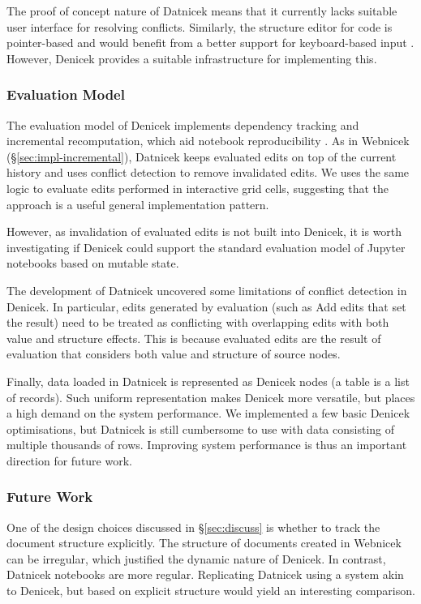 \documentclass[sigconf,anonymous,screen]{acmart}
\newcommand{\ident}[1]{{\sffamily #1}}
\begin{document}
The proof of concept nature of Datnicek means that it currently lacks suitable user interface for
resolving conflicts. Similarly, the structure editor for code is pointer-based and would benefit from
a better support for keyboard-based input \cite{moon-2022-tylr,beckman-2023-sandblocks}.
However, Denicek provides a suitable infrastructure for implementing this.

\subsubsection*{Evaluation Model}
The evaluation model of Denicek implements dependency tracking and incremental recomputation,
which aid notebook reproducibility \cite{petricek-2018-wrattler,koop-2017-dataflow}. As in
Webnicek (\S\ref{sec:impl-incremental}), Datnicek keeps evaluated edits on top of the current history
and uses conflict detection to remove invalidated edits. We uses the same logic to evaluate
edits performed in interactive grid cells, suggesting that the approach is a useful general
implementation pattern.

However, as invalidation of evaluated edits is not built into Deni\-cek, it is worth investigating
if Denicek could support the standard evaluation model of Jupyter notebooks based on mutable state.

The development of Datnicek uncovered some limitations of conflict detection in Denicek.
In particular, edits generated by evaluation (such as \ident{Add} edits that set the
result) need to be treated as conflicting with overlapping edits with both value and structure
effects. This is because evaluated edits are the result of evaluation that considers both value
and structure of source nodes.

Finally, data loaded in Datnicek is represented as Denicek nodes (a table is a list of
records). Such uniform representation makes De\-ni\-cek more versatile, but places a high demand on the
system performance. We implemented a few basic Denicek optimisations, but Datnicek is still cumbersome
to use with data consisting of multiple thousands of rows. Improving system performance is
thus an important direction for future work.

\subsubsection*{Future Work}
One of the design choices discussed in \S\ref{sec:discuss} is whether to track the document
structure explicitly. The structure of documents created in Webnicek can be irregular,
which justified the dynamic nature of Denicek. In contrast, Datnicek notebooks are more regular.
Replicating Datnicek using a system akin to Denicek, but based on explicit structure would
yield an interesting comparison.
\end{document}
